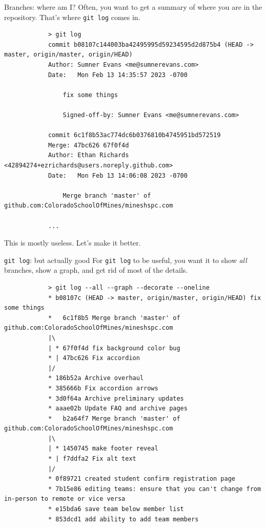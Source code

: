 \documentclass{beeper}
\begin{document}
\begin{frame}[fragile]{Branches: where am I?}
    Often, you want to get a summary of where you are in the repository. That's
    where \texttt{git log} comes in.

    {
        \tiny
        \begin{verbatim}
            > git log
            commit b08107c144003ba42495995d59234595d2d875b4 (HEAD -> master, origin/master, origin/HEAD)
            Author: Sumner Evans <me@sumnerevans.com>
            Date:   Mon Feb 13 14:35:57 2023 -0700

                fix some things

                Signed-off-by: Sumner Evans <me@sumnerevans.com>

            commit 6c1f8b53ac774dc6b0376810b4745951bd572519
            Merge: 47bc626 67f0f4d
            Author: Ethan Richards <42894274+ezrichards@users.noreply.github.com>
            Date:   Mon Feb 13 14:06:08 2023 -0700

                Merge branch 'master' of github.com:ColoradoSchoolOfMines/mineshspc.com

            ...
        \end{verbatim}
    }
    \pause
    This is mostly useless. Let's make it better.
\end{frame}

\begin{frame}[fragile]{\texttt{git log}: but actually good}
    For \texttt{git log} to be useful, you want it to show \textit{all}
    branches, show a graph, and get rid of most of the details.

    {
        \tiny
        \begin{verbatim}
            > git log --all --graph --decorate --oneline
            * b08107c (HEAD -> master, origin/master, origin/HEAD) fix some things
            *   6c1f8b5 Merge branch 'master' of github.com:ColoradoSchoolOfMines/mineshspc.com
            |\
            | * 67f0f4d fix background color bug
            * | 47bc626 Fix accordion
            |/
            * 186b52a Archive overhaul
            * 385666b Fix accordion arrows
            * 3d0f64a Archive preliminary updates
            * aaae02b Update FAQ and archive pages
            *   b2a64f7 Merge branch 'master' of github.com:ColoradoSchoolOfMines/mineshspc.com
            |\
            | * 1450745 make footer reveal
            * | f7ddfa2 Fix alt text
            |/
            * 0f89721 created student confirm registration page
            * 7b15e86 editing teams: ensure that you can't change from in-person to remote or vice versa
            * e15bda6 save team below member list
            * 853dcd1 add ability to add team members
            \end{verbatim}
    }
\end{frame}
\end{document}
